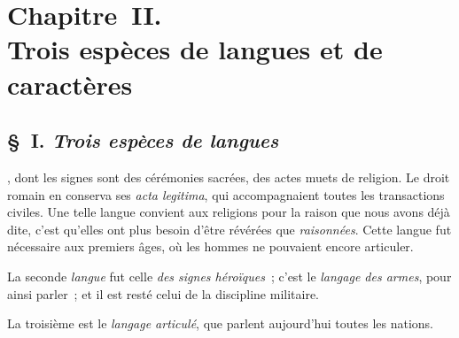 \documentclass[french,twoside]{book} %
\newcommand\chapteropen{} %
\newcommand\chaptercont{} %
\begin{document}
\chapteropen
\chapter[{Chapitre II. Trois espèces de langues et de caractères}]{Chapitre II. \\
Trois espèces de langues et de caractères}

\chaptercont
\section[{§ I. Trois espèces de langues}]{§ I. {\itshape Trois espèces de langues}}
, dont les signes sont des cérémonies sacrées, des actes muets de religion. Le droit romain en conserva ses {\itshape acta legitima}, qui accompagnaient toutes les transactions civiles. Une telle langue convient aux religions pour la raison que nous avons déjà dite, c’est qu’elles ont plus besoin d’être révérées que {\itshape raisonnées}. Cette langue fut nécessaire aux premiers âges, où les hommes ne pouvaient encore articuler.\par
La seconde {\itshape langue} fut celle {\itshape des signes héroïques} ; c’est le {\itshape langage des armes}, pour ainsi parler ; et il est resté celui de la discipline militaire.\par
La troisième est le {\itshape langage articulé}, que parlent aujourd’hui toutes les nations.
\end{document}
